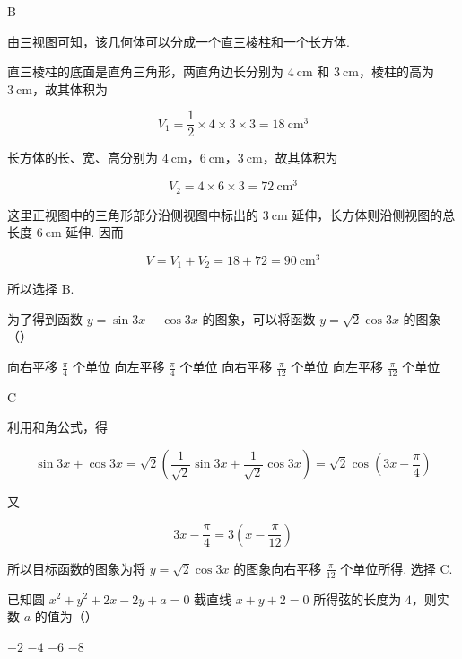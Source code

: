 \begin{answer}
B
\end{answer}

\begin{solution}
由三视图可知，该几何体可以分成一个直三棱柱和一个长方体.

直三棱柱的底面是直角三角形，两直角边长分别为 \(4\mathrm{~cm}\) 和 \(3\mathrm{~cm}\)，棱柱的高为 \(3\mathrm{~cm}\)，故其体积为

\[
V_{1}=\frac{1}{2}\times4\times3\times3=18\mathrm{~cm}^{3}
\]

长方体的长、宽、高分别为 \(4\mathrm{~cm}\)，\(6\mathrm{~cm}\)，\(3\mathrm{~cm}\)，故其体积为

\[
V_{2}=4\times6\times3=72\mathrm{~cm}^{3}
\]

这里正视图中的三角形部分沿侧视图中标出的 \(3\mathrm{~cm}\) 延伸，长方体则沿侧视图的总长度 \(6\mathrm{~cm}\) 延伸. 因而

\[
V=V_{1}+V_{2}=18+72=90\mathrm{~cm}^{3}
\]

所以选择 B.
\end{solution}

\begin{problem}
为了得到函数 \( y = \sin 3x + \cos 3x \) 的图象，可以将函数 \( y = \sqrt{2}\cos 3x \) 的图象（\quad）

\choices
    {向右平移 \(\frac{\pi}{4}\) 个单位}
    {向左平移 \(\frac{\pi}{4}\) 个单位}
    {向右平移 \(\frac{\pi}{12}\) 个单位}
    {向左平移 \(\frac{\pi}{12}\) 个单位}
\end{problem}

\begin{answer}
C
\end{answer}

\begin{solution}
利用和角公式，得

\[
\sin3x+\cos3x
=\sqrt{2}\left(\frac{1}{\sqrt{2}}\sin3x+\frac{1}{\sqrt{2}}\cos3x\right)
=\sqrt{2}\cos\left(3x-\frac{\pi}{4}\right)
\]

又

\[
3x-\frac{\pi}{4}=3\left(x-\frac{\pi}{12}\right)
\]

所以目标函数的图象为将 \(y=\sqrt{2}\cos3x\) 的图象向右平移 \(\frac{\pi}{12}\) 个单位所得. 选择 C.
\end{solution}

\begin{problem}
已知圆 \(x^{2} + y^{2} + 2x - 2y + a = 0\) 截直线 \(x + y + 2 = 0\) 所得弦的长度为 \(4\)，则实数 \(a\) 的值为（\quad）

\choices
    {\(-2\)}
    {\(-4\)}
    {\(-6\)}
    {\(-8\)}
\end{problem}

